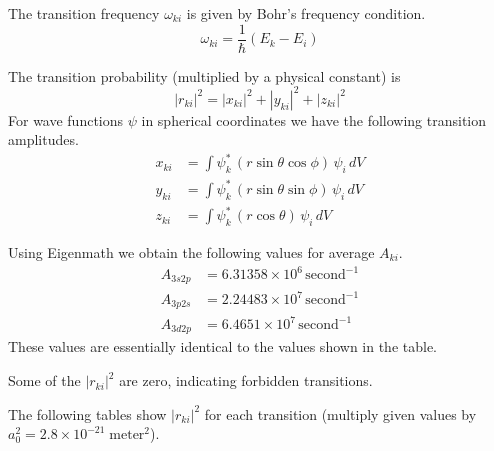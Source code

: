 \documentclass[12pt]{article}
\begin{document}
\noindent
The transition frequency $\omega_{ki}$ is given by Bohr's frequency condition.
\begin{equation*}
\omega_{ki}=\frac{1}{\hbar}(E_k-E_i)
\end{equation*}

\noindent
The transition probability (multiplied by a physical constant) is
\begin{equation*}
|r_{ki}|^2
=|x_{ki}|^2
+|y_{ki}|^2
+|z_{ki}|^2
\end{equation*}
For wave functions $\psi$ in spherical coordinates we have the following transition amplitudes.
\begin{align*}
x_{ki}&=\int\psi_k^*\,(r\sin\theta\cos\phi)\,\psi_i\,dV
\\
y_{ki}&=\int\psi_k^*\,(r\sin\theta\sin\phi)\,\psi_i\,dV
\\
z_{ki}&=\int\psi_k^*\,(r\cos\theta)\,\psi_i\,dV
\end{align*}

\noindent
Using Eigenmath we obtain the following values for average $A_{ki}$.
\begin{align*}
A_{3s2p}&=6.31358\times10^6\,\text{second}^{-1}
\\
A_{3p2s}&=2.24483\times10^7\,\text{second}^{-1}
\\
A_{3d2p}&=6.4651\times10^7\,\text{second}^{-1}
\end{align*}
These values are essentially identical to the values shown in the table.

\bigskip
\noindent
Some of the $|r_{ki}|^2$ are zero, indicating forbidden transitions.

\bigskip
\noindent
The following tables show $|r_{ki}|^2$ for each transition
(multiply given values by $a_0^2=2.8\times10^{-21}\;\text{meter}^2$).
\end{document}
